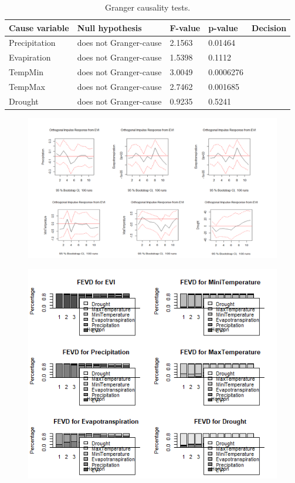 \begin{table}[]
	\label{Optimal lag}
	\caption{Granger causality tests.}
	\centering
	\addtolength{\tabcolsep}{5pt}
	\begin{tabularx}{\textwidth}{@{}lllll@{}}
	\hline
	Cause variable &Null hypothesis& F-value& p-value& Decision\\
	\hline\hline
Precipitation	& does not Granger-cause &2.1563  & 0.01464  &  \\
	\hline
Evapiration	& does not Granger-cause & 1.5398 & 0.1112 &  \\
	\hline
TempMin	&  does not Granger-cause&3.0049  & 0.0006276 &  \\
	\hline
TempMax	& does not Granger-cause &2.7462  & 0.001685 &  \\
	\hline
Drought	& does not Granger-cause & 0.9235 & 0.5241 &  \\
	\hline
\end{tabularx}
\end{table}

\begin{figure}
	\centering
	\includegraphics[width=0.7\linewidth]{images/impose}
	\caption{}
	\label{fig:impose}
\end{figure}
\begin{figure}
	\centering
	\includegraphics[width=0.7\linewidth]{images/Rplot12}
	\caption{}
	\label{fig:rplot12}
\end{figure}

